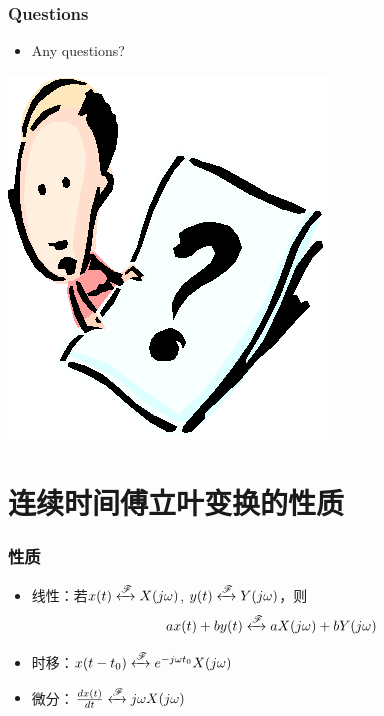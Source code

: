 \documentclass[CJKutf8,xcolor=pdftex,dvipsnames,table]{beamer}
\begin{document}
\begin{CJK*}{UTF8}{song}
  \begin{frame}
    \frametitle{Questions}
    \begin{itemize}
    \item Any questions?
    \end{itemize}
    \begin{center}
      \includegraphics[scale=.5]{question}
    \end{center}
  \end{frame}   

	\section{连续时间傅立叶变换的性质}

  \begin{frame}
    \frametitle{性质}
    \begin{itemize}
    \item 线性：若$x(t) \xleftrightarrow{\mathscr{F}} X(j\omega)$, $y(t)\xleftrightarrow{\mathscr{F}}Y(j\omega)$，则
    \[
    ax(t)+by(t) \xleftrightarrow{\mathscr{F}} aX(j\omega)+bY(j\omega)
    \]
    \item 时移：$x(t-t_0) \xleftrightarrow{\mathscr{F}} e^{-j\omega t_0}X(j\omega)$
    \item 微分：$\frac{dx(t)}{dt} \xleftrightarrow{\mathscr{F}} j\omega X(j\omega)$
	\end{itemize}
  \end{frame}    


\end{CJK*}
\end{document}
